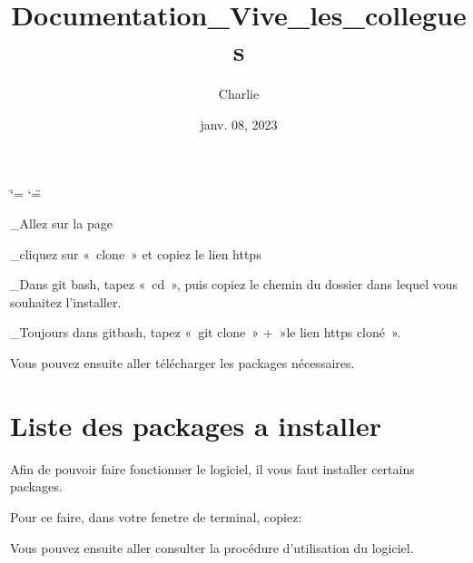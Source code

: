 \documentclass[letterpaper,10pt,french]{sphinxmanual}
\title{Documentation\_Vive\_les\_collegues}
\date{janv. 08, 2023}
\author{Charlie}
\begin{document}
\ifdefined\shorthandoff
  \ifnum\catcode`\=\string=\active\shorthandoff{=}\fi
  \ifnum\catcode`\"=\active{}\fi
\fi

\pagestyle{empty}
\sphinxmaketitle
\pagestyle{plain}
\sphinxtableofcontents
\pagestyle{normal}
\label{\detokenize{index::doc}}
\sphinxstepscope



\_Allez sur la page 

\_cliquez sur « clone » et copiez le lien https

\_Dans git bash, tapez « cd », puis copiez le chemin du dossier dans lequel vous souhaitez l’installer.

\_Toujours dans gitbash, tapez « git clone » + »le lien https cloné ».

\sphinxAtStartPar
Vous pouvez ensuite aller télécharger les packages nécessaires.

\sphinxstepscope


\chapter{Liste des packages a installer}
\label{\detokenize{Liste_des_packages_a_installer:liste-des-packages-a-installer}}\label{\detokenize{Liste_des_packages_a_installer::doc}}
\sphinxAtStartPar
Afin de pouvoir faire fonctionner le logiciel, il vous faut installer certains packages.

\sphinxAtStartPar
Pour ce faire, dans votre fenetre de terminal, copiez:

\begin{sphinxVerbatim}[commandchars=\\\{\}]
  
  
  
\end{sphinxVerbatim}

\sphinxAtStartPar
Vous pouvez ensuite aller consulter la procédure d’utilisation du logiciel.

\sphinxstepscope
\end{document}
